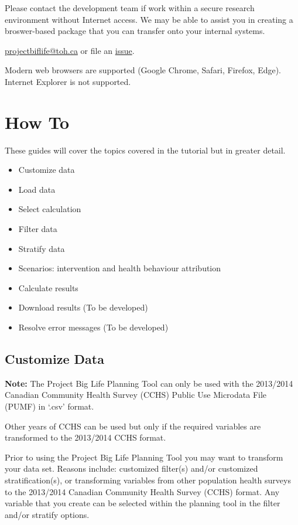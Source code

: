 \documentclass[]{book}
\providecommand{\tightlist}{%
  \setlength{\itemsep}{0pt}\setlength{\parskip}{0pt}}
\begin{document}
Please contact the development team if work within a secure research
environment without Internet access. We may be able to assist you in
creating a broswer-based package that you can transfer onto your
internal systems.

\href{mailto:projectbiglife.ca}{projectbiflife@toh.ca} or file an
\href{https://github.com/Big-Life-Lab/PBL-Planning-Tool-Guidance/issues}{issue}.

Modern web browsers are supported (Google Chrome, Safari, Firefox,
Edge). Internet Explorer is not supported.

\hypertarget{howto}{\chapter{How To}\label{howto}}

These guides will cover the topics covered in the tutorial but in
greater detail.

\begin{itemize}
\tightlist
\item
  Customize data
\item
  Load data
\item
  Select calculation
\item
  Filter data
\item
  Stratify data
\item
  Scenarios: intervention and health behaviour attribution
\item
  Calculate results
\item
  Download results (To be developed)
\item
  Resolve error messages (To be developed)
\end{itemize}

\section{Customize Data}\label{customize-data}

\textbf{Note:} The Project Big Life Planning Tool can only be used with
the 2013/2014 Canadian Community Health Survey (CCHS) Public Use
Microdata File (PUMF) in `.csv' format.

Other years of CCHS can be used but only if the required variables are
transformed to the 2013/2014 CCHS format.

Prior to using the Project Big Life Planning Tool you may want to
transform your data set. Reasons include: customized filter(s) and/or
customized stratification(s), or transforming variables from other
population health surveys to the 2013/2014 Canadian Community Health
Survey (CCHS) format. Any variable that you create can be selected
within the planning tool in the filter and/or stratify options.
\end{document}
